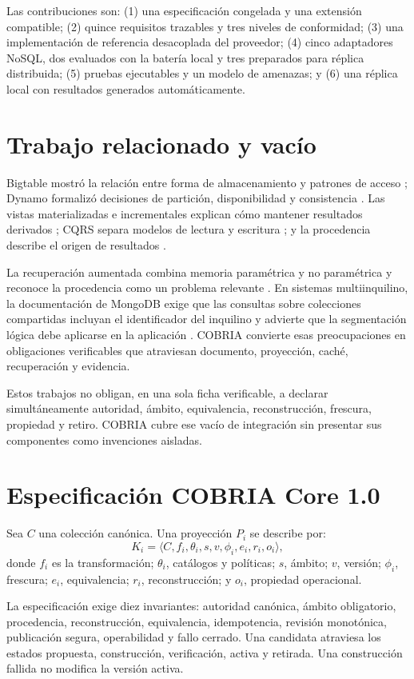 \documentclass[11pt]{article}
\begin{document}
Las contribuciones son: (1) una especificación congelada y una extensión compatible; (2) quince requisitos trazables y tres niveles de conformidad; (3) una implementación de referencia desacoplada del proveedor; (4) cinco adaptadores NoSQL, dos evaluados con la batería local y tres preparados para réplica distribuida; (5) pruebas ejecutables y un modelo de amenazas; y (6) una réplica local con resultados generados automáticamente.

\section{Trabajo relacionado y vacío}
Bigtable mostró la relación entre forma de almacenamiento y patrones de acceso \cite{chang}; Dynamo formalizó decisiones de partición, disponibilidad y consistencia \cite{dynamo}. Las vistas materializadas e incrementales explican cómo mantener resultados derivados \cite{gupta}; CQRS separa modelos de lectura y escritura \cite{fowler}; y la procedencia describe el origen de resultados \cite{buneman}.

La recuperación aumentada combina memoria paramétrica y no paramétrica y reconoce la procedencia como un problema relevante \cite{rag}. En sistemas multiinquilino, la documentación de MongoDB exige que las consultas sobre colecciones compartidas incluyan el identificador del inquilino y advierte que la segmentación lógica debe aplicarse en la aplicación \cite{mongoTenant}. COBRIA convierte esas preocupaciones en obligaciones verificables que atraviesan documento, proyección, caché, recuperación y evidencia.

Estos trabajos no obligan, en una sola ficha verificable, a declarar simultáneamente autoridad, ámbito, equivalencia, reconstrucción, frescura, propiedad y retiro. COBRIA cubre ese vacío de integración sin presentar sus componentes como invenciones aisladas.

\section{Especificación COBRIA Core 1.0}
Sea $C$ una colección canónica. Una proyección $P_i$ se describe por:
\[
K_i=\langle C,f_i,\theta_i,s,v,\phi_i,e_i,r_i,o_i\rangle,
\]
donde $f_i$ es la transformación; $\theta_i$, catálogos y políticas; $s$, ámbito; $v$, versión; $\phi_i$, frescura; $e_i$, equivalencia; $r_i$, reconstrucción; y $o_i$, propiedad operacional.

La especificación exige diez invariantes: autoridad canónica, ámbito obligatorio, procedencia, reconstrucción, equivalencia, idempotencia, revisión monotónica, publicación segura, operabilidad y fallo cerrado. Una candidata atraviesa los estados propuesta, construcción, verificación, activa y retirada. Una construcción fallida no modifica la versión activa.
\end{document}
